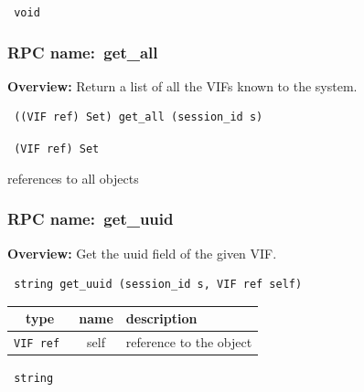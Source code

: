 \vspace{0.3cm}

{\tt 
void
}



\vspace{0.3cm}
\vspace{0.3cm}
\vspace{0.3cm}
\subsubsection{RPC name:~get\_all}

{\bf Overview:} 
Return a list of all the VIFs known to the system.

\begin{verbatim} ((VIF ref) Set) get_all (session_id s)\end{verbatim}


\vspace{0.3cm}

{\tt 
(VIF ref) Set
}


references to all objects
\vspace{0.3cm}
\vspace{0.3cm}
\vspace{0.3cm}
\subsubsection{RPC name:~get\_uuid}

{\bf Overview:} 
Get the uuid field of the given VIF.

\begin{verbatim} string get_uuid (session_id s, VIF ref self)\end{verbatim}



 
\vspace{0.3cm}
\begin{tabular}{|c|c|p{7cm}|}
 \hline
{\bf type} & {\bf name} & {\bf description} \\ \hline
{\tt VIF ref } & self & reference to the object \\ \hline 

\end{tabular}

\vspace{0.3cm}

{\tt 
string
}


